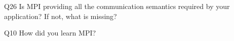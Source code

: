 \begin{description}%
\item{Q26} Is MPI providing all the communication semantics required by your application? If not, what is missing?%
\item{Q10} How did you learn MPI?%
\end{description}%
